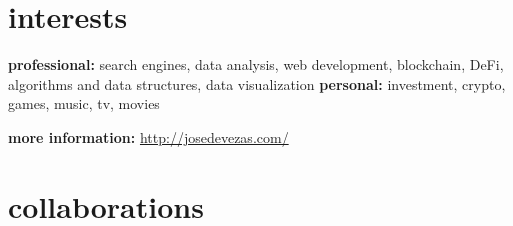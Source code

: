 \documentclass{friggeri-cv}
\begin{document}

\section{interests}

\textbf{professional:} search engines, data analysis, web development, blockchain, DeFi, algorithms and data structures, data visualization \textbf{personal:} investment, crypto, games, music, tv, movies

\textbf{more information:} \url{http://josedevezas.com/}


\section{collaborations}
\end{document}
